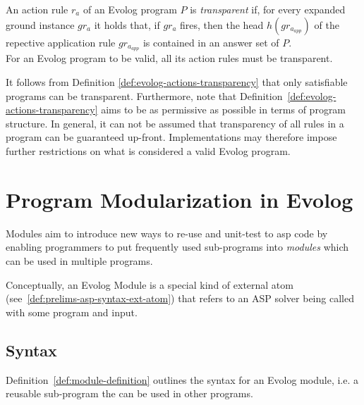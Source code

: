 \begin{definition}
\label{def:evolog-actions-transparency}
An action rule $r_a$ of an Evolog program $P$ is \emph{transparent} if, for every expanded ground instance $gr_a$ it holds that, if $gr_a$ fires, then the head $h(gr_{a_{app}})$ of the repective application rule $gr_{a_{app}}$ is contained in an answer set of $P$. \\

For an Evolog program to be valid, all its action rules must be transparent.
\end{definition}

It follows from Definition \ref{def:evolog-actions-transparency} that only satisfiable programs can be transparent. Furthermore, note that Definition~\ref{def:evolog-actions-transparency} aims to be as permissive as possible in terms of program structure. In general, it can not be assumed that transparency of all rules in a program can be guaranteed up-front. Implementations may therefore impose further restrictions on what is considered a valid Evolog program. 


\section{Program Modularization in Evolog}
\label{sec:evolog-modules}

Modules aim to introduce new ways to re-use and unit-test to \gls{asp} code by enabling programmers to put frequently used sub-programs into \emph{modules} which can be used in multiple programs.

Conceptually, an Evolog Module is a special kind of external atom (see~\ref{def:prelims-asp-syntax-ext-atom}) that refers to an ASP solver being called with some program and input.

\subsection{Syntax}
\label{subsec:evolog-modules-syntax}

Definition~\ref{def:module-definition} outlines the syntax for an Evolog module, i.e. a reusable sub-program the can be used in other programs.


